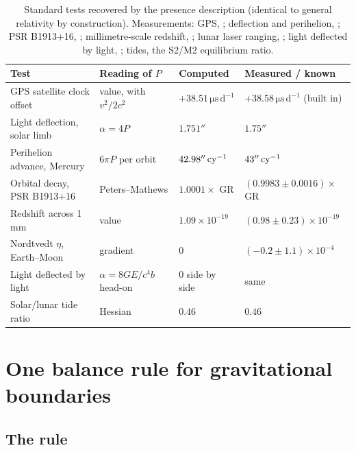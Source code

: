 \documentclass[11pt]{article}
\newcommand{\unit}[1]{\,\mathrm{#1}}
\begin{document}
\begin{table}[t]
\centering
\caption{Standard tests recovered by the presence description (identical to general relativity by construction). Measurements: GPS, \citet{Ashby2003}; deflection and perihelion, \citet{Will2014}; PSR B1913+16, \citet{WeisbergHuang2016}; millimetre-scale redshift, \citet{Bothwell2022}; lunar laser ranging, \citet{Muller2023}; light deflected by light, \citet{Tolman1931}; tides, the S2/M2 equilibrium ratio.}
\label{tab:standard}
\small
\begin{tabular}{@{}llll@{}}
\toprule
Test & Reading of $P$ & Computed & Measured / known \\
\midrule
GPS satellite clock offset & value, with $v^2/2c^2$ & $+38.51\unit{\mu s\,d^{-1}}$ & $+38.58\unit{\mu s\,d^{-1}}$ (built in)\\
Light deflection, solar limb & $\alpha=4P$ & $1.751''$ & $1.75''$\\
Perihelion advance, Mercury & $6\pi P$ per orbit & $42.98''\,{\rm cy}^{-1}$ & $43''\,{\rm cy}^{-1}$\\
Orbital decay, PSR B1913+16 & Peters--Mathews & $1.0001\times$ GR & $(0.9983\pm0.0016)\times$ GR\\
Redshift across 1\,mm & value & $1.09\times10^{-19}$ & $(0.98\pm0.23)\times10^{-19}$\\
Nordtvedt $\eta$, Earth--Moon & gradient & $0$ & $(-0.2\pm1.1)\times10^{-4}$\\
Light deflected by light & $\alpha=8GE/c^4b$ head-on & $0$ side by side & same \\
Solar/lunar tide ratio & Hessian & $0.46$ & $0.46$\\
\bottomrule
\end{tabular}
\end{table}

\section{One balance rule for gravitational boundaries}
\label{sec:rings}

\subsection{The rule}
\end{document}
